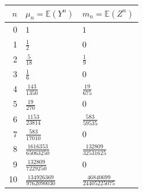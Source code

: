 \begin{tabular}{@{}rll@{}}
\toprule
$n$ & $\mu_n=\mathbb E(Y^n)$ & $m_n=\mathbb E(Z^n)$ \\ 
\midrule
0 & $1$ & $1$ \\
1 & $\frac{1}{2}$ & $0$ \\
2 & $\frac{5}{18}$ & $\frac{1}{9}$ \\
3 & $\frac{1}{6}$ & $0$ \\
4 & $\frac{143}{1350}$ & $\frac{19}{675}$ \\
5 & $\frac{19}{270}$ & $0$ \\
6 & $\frac{1153}{23814}$ & $\frac{583}{59535}$ \\
7 & $\frac{583}{17010}$ & $0$ \\
8 & $\frac{1616353}{65063250}$ & $\frac{132809}{32531625}$ \\
9 & $\frac{132809}{7229250}$ & $0$ \\
10 & $\frac{134926369}{9762090030}$ & $\frac{46840699}{24405225075}$ \\
\bottomrule
\end{tabular}
